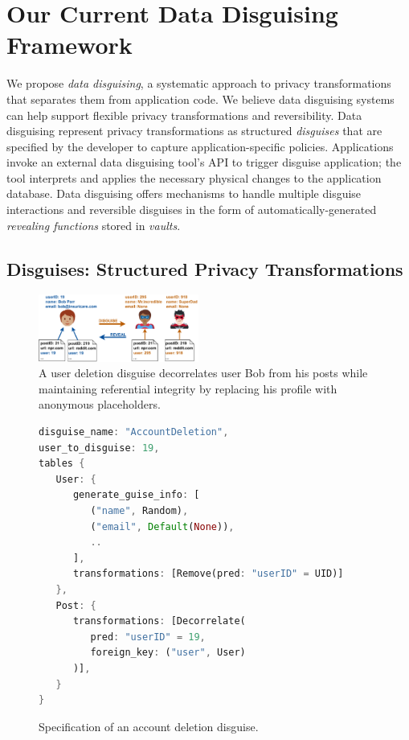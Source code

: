 \section{Our Current Data Disguising Framework}

We propose \emph{data disguising}, a systematic approach to privacy transformations that separates
them from application code. We believe data disguising systems can help support flexible privacy
transformations and reversibility.
%
Data disguising represent privacy transformations as structured \emph{disguises} that are specified
by the developer to capture application-specific policies.
%
Applications invoke an external data disguising tool's API to trigger disguise application; the tool
interprets and applies the necessary physical changes to the application database.
%
Data disguising offers mechanisms to handle multiple disguise interactions and reversible disguises
in the form of automatically-generated \emph{revealing functions} stored in \emph{vaults}.

%
%

\subsection{Disguises: Structured Privacy Transformations}
\label{sec:disguises}

\begin{figure}[t]
    \centering
    \includegraphics[width=0.47\textwidth]{img/disguises_new}

    \caption{A user deletion disguise decorrelates user Bob from his posts while maintaining
    referential integrity by replacing his profile with anonymous placeholders.}
    \label{fig:example}
\end{figure}

\begin{figure}[t!]
    \centering
    \footnotesize
\begin{lstlisting}[language=Rust]
disguise_name: "AccountDeletion",
user_to_disguise: 19,
tables {
   User: {
      generate_guise_info: [
         ("name", Random),
         ("email", Default(None)),
         ..
      ],
      transformations: [Remove(pred: "userID" = UID)]
   },
   Post: {
      transformations: [Decorrelate(
         pred: "userID" = 19,
         foreign_key: ("user", User)
      )],
   }
}
\end{lstlisting}
    \caption{Specification of an account deletion disguise.}
    \label{fig:spec}
\end{figure}

